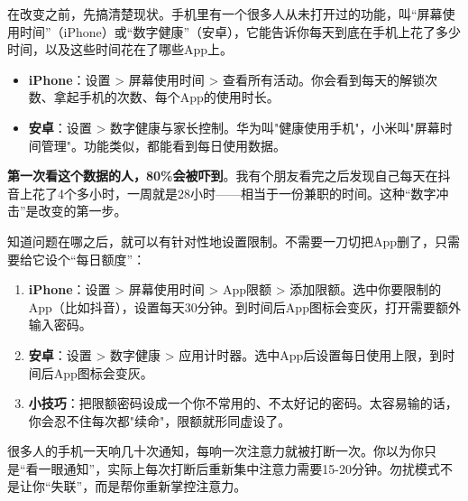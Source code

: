 


在改变之前，先搞清楚现状。手机里有一个很多人从未打开过的功能，叫“屏幕使用时间”（iPhone）或“数字健康”（安卓），它能告诉你每天到底在手机上花了多少时间，以及这些时间花在了哪些App上。

\begin{itemize}
  \item \textbf{iPhone}：设置 > 屏幕使用时间 > 查看所有活动。你会看到每天的解锁次数、拿起手机的次数、每个App的使用时长。
  \item \textbf{安卓}：设置 > 数字健康与家长控制。华为叫"健康使用手机"，小米叫"屏幕时间管理"。功能类似，都能看到每日使用数据。
\end{itemize}

\textbf{第一次看这个数据的人，80\%会被吓到}。我有个朋友看完之后发现自己每天在抖音上花了4个多小时，一周就是28小时——相当于一份兼职的时间。这种“数字冲击”是改变的第一步。


知道问题在哪之后，就可以有针对性地设置限制。不需要一刀切把App删了，只需要给它设个“每日额度”：

\begin{enumerate}
  \item \textbf{iPhone}：设置 > 屏幕使用时间 > App限额 > 添加限额。选中你要限制的App（比如抖音），设置每天30分钟。到时间后App图标会变灰，打开需要额外输入密码。
  \item \textbf{安卓}：设置 > 数字健康 > 应用计时器。选中App后设置每日使用上限，到时间后App图标会变灰。
  \item \textbf{小技巧}：把限额密码设成一个你不常用的、不太好记的密码。太容易输的话，你会忍不住每次都"续命"，限额就形同虚设了。
\end{enumerate}


很多人的手机一天响几十次通知，每响一次注意力就被打断一次。你以为你只是“看一眼通知”，实际上每次打断后重新集中注意力需要15-20分钟。勿扰模式不是让你“失联”，而是帮你重新掌控注意力。

